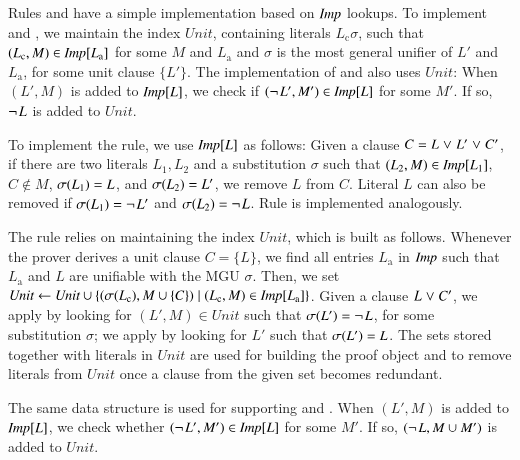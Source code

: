 \newcommand{\unitset}{\ensuremath{\textit{Unit}}}
\begin{conf} 
Rules  and  have a simple
implementation based on $\textit{Imp}$ lookups. To implement  and
, we maintain the index \unitset, containing literals
$L_\mathrm{c}\sigma$, such that $(L_\mathrm{c}, M) \in \textit{Imp}[L_\mathrm{a}]$ for
some $M$ and $L_\mathrm{a}$ and $\sigma$ is the most general unifier of $L'$ and
$L_\mathrm{a}$, for some unit clause $\{ L' \}$. The implementation
of  and  also uses \unitset:
When $(L',M)$ is added to $\textit{Imp}[L]$, we
check if $(\neg{\kern.2ex L'},M') \in \textit{Imp}[L]$ for some $M'$. If so, $\neg{\kern.2ex L}$
is added to $\unitset$.
\end{conf}
\begin{rep}
   
   To implement the  rule, we use $\textit{Imp}[L]$ as
   follows: Given a clause $C = L \mathrel{\lor} L' \mathrel{\lor} C'$, if there are two literals
   $L_1,L_2$ and a substitution $\sigma$ such that $(L_2, M) \in \textit{Imp}[L_1]$,
   $C \not\in M$,  $\sigma(L_1) = L$, and $\sigma(L_2) = L'$, we remove $L$ from $C$.
   Literal $L$ can also be removed if $\sigma(L_1) = \neg{\kern.2ex L'}$ and $\sigma(L_2) = \neg{\kern.2ex L}$. 
   Rule  is implemented analogously.

   The  rule relies on maintaining the index $\unitset$, which is
   built as follows. Whenever the prover derives a unit clause $C = \{ L \}$, we
   find all entries $L_\mathrm{a}$ in $\textit{Imp}$ such that $L_\mathrm{a}$ and $L$
   are unifiable with the MGU $\sigma$. Then, we set $\unitset
   \gets \unitset \cup \{ (\sigmaterm{L_\mathrm{c}}, M \cup \{ C \} ) \mid
   (L_\mathrm{c}, M) \in \impmap[L_\mathrm{a}] \}$. Given a clause $L \mathrel{\lor} C'$,
   we apply  by looking for $(L', M) \in \unitset$ such that
   $\sigma(L') = \neg{\kern.2ex L}$, for some substitution $\sigma$; we apply
    by looking for $L'$ such that $\sigma(L') = L$.  The sets
   stored together with literals in $\unitset$ are used for building the proof
   object and to remove literals from $\unitset$ once a clause from the given
   set becomes redundant.

   The same data structure is used
   for supporting  and . When $(L',M)$ is added to $\textit{Imp}[L]$, we
   check whether $(\neg{\kern.2ex L'},M') \in \textit{Imp}[L]$ for some $M'$. If so, $(\neg{\kern.2ex L}, M \cup M')$
   is added to $\unitset$.
\end{rep}


